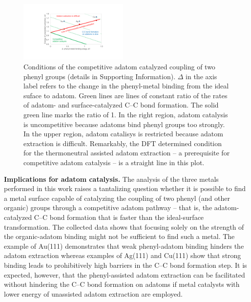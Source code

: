 \documentclass[aps,prb,reprint,amsmath,amssymb]{revtex4-1}
\newcommand{\sinfo}{Supporting Information}
\begin{document}
\begin{figure}[bt]
\centering
\includegraphics[width=0.48\textwidth]{Fig/conclusion.pdf}
\caption{Conditions of the competitive adatom catalyzed coupling of two phenyl groups (details in \sinfo). $\Delta$ in the axis label refers to the change in the phenyl-metal binding from the ideal suface to adatom. Green lines are lines of constant ratio of the rates of adatom- and surface-catalyzed C--C bond formation. The solid green line marks the ratio of 1. In the right region, adatom catalysis is uncompetitive because adatoms bind phenyl groups too strongly.  In the upper region, adatom catalisys is restricted because adatom extraction is difficult. Remarkably, the DFT determined condition for the thermoneutral assisted adatom extraction -- a prerequisite for competitive adatom catalysis -- is a straight line in this plot.} 
\label{fig:conclusion}
\end{figure}

\textbf{Implications for adatom catalysis.} 
%
The analysis of the three metals performed in this work raises a tantalizing question whether it is possible to find a metal surface capable of catalyzing the coupling of two phenyl (and other organic) groups through a competitive adatom pathway -- that is, the adatom-catalyzed C--C bond formation that is faster than the ideal-surface transformation. 
The collected data shows that focusing solely on the strength of the organic-adatom binding might not be sufficient to find such a metal. The example of Au(111) demonstrates that weak phenyl-adatom binding hinders the adatom extraction whereas examples of Ag(111) and Cu(111) show that strong binding leads to prohibitively high barriers in the C--C bond formation step. It is expected, however, that the phenyl-assisted adatom extraction can be facilitated without hindering the C--C bond formation on adatoms if metal catalysts with lower energy of unassisted adatom extraction are employed. 
\end{document}
